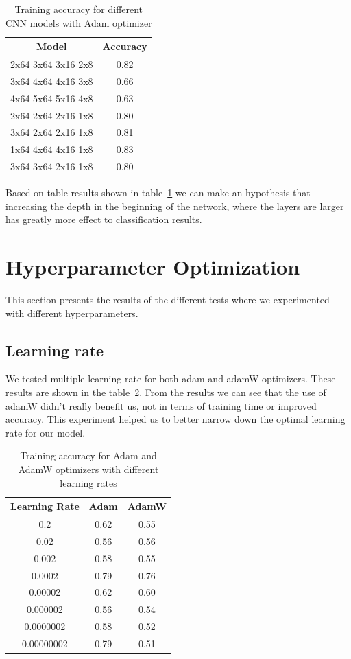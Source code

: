 \documentclass[12pt,a4paper,english
]{tunithesis}
\begin{document}
\begin{table}[h!]
\centering
\caption{Training accuracy for different CNN models with Adam optimizer}
\begin{tabular}{|c|c|}
\hline
\textbf{Model} & \textbf{Accuracy}  \\ \hline
2x64 3x64 3x16 2x8 & 0.82 \\ \hline
3x64 4x64 4x16 3x8 & 0.66 \\ \hline
4x64 5x64 5x16 4x8 & 0.63 \\ \hline
2x64 2x64 2x16 1x8 & 0.80 \\ \hline
3x64 2x64 2x16 1x8 & 0.81 \\ \hline
1x64 4x64 4x16 1x8 & 0.83 \\ \hline
3x64 3x64 2x16 1x8 & 0.80 \\ \hline
\end{tabular}
\label{tab:models}
\end{table}

Based on table results shown in table~\ref{tab:models} we can make an hypothesis that increasing the depth in the beginning of the network, where the layers are larger has greatly more effect to classification results.

\section{Hyperparameter Optimization}
This section presents the results of the different tests where we experimented with different hyperparameters.

\subsection{Learning rate}
We tested multiple learning rate for both adam and adamW optimizers. These results are shown in the table~\ref{tab:learningrates}. From the results we can see that the use of adamW didn't really benefit us, not in terms of training time or improved accuracy. This experiment helped us to better narrow down the optimal learning rate for our model.
\begin{table}[h!]
\centering
\caption{Training accuracy for Adam and AdamW optimizers with different learning rates}
\begin{tabular}{|c|c|c|}
\hline
\textbf{Learning Rate} & \textbf{Adam} & \textbf{AdamW} \\ \hline
0.2 & 0.62 & 0.55 \\ \hline
0.02 & 0.56 & 0.56 \\ \hline
0.002 & 0.58 & 0.55 \\ \hline
0.0002 & 0.79 & 0.76 \\ \hline
0.00002 & 0.62 & 0.60 \\ \hline
0.000002 & 0.56 & 0.54 \\ \hline
0.0000002 & 0.58 & 0.52 \\ \hline
0.00000002 & 0.79 & 0.51 \\ \hline
\end{tabular}
\label{tab:learningrates}
\end{table}
\end{document}
